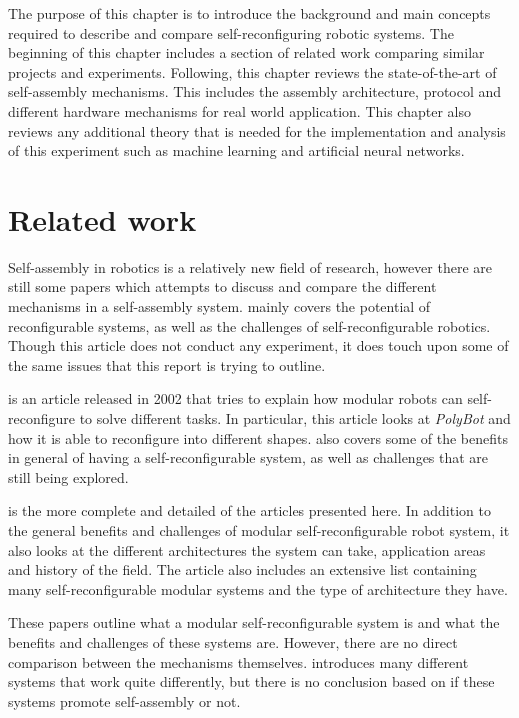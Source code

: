 The purpose of this chapter is to introduce the background and main concepts required to describe and compare self-reconfiguring robotic systems.
The beginning of this chapter includes a section of related work comparing similar projects and experiments.
Following, this chapter reviews the state-of-the-art of self-assembly mechanisms.
This includes the assembly architecture, protocol and different hardware mechanisms for real world application.
This chapter also reviews any additional theory that is needed for the implementation and analysis of this experiment such as machine learning and artificial neural networks.

\section{Related work}
Self-assembly in robotics is a relatively new field of research, however there are still some papers which attempts to discuss and compare the different mechanisms in a self-assembly system. 
\cite{murata_self-reconfigurable_2007} mainly covers the potential of reconfigurable systems, as well as the challenges of self-reconfigurable robotics. 
Though this article does not conduct any experiment, it does touch upon some of the same issues that this report is trying to outline.

\cite{yim_modular_2002} is an article released in 2002 that tries to explain how modular robots can self-reconfigure to solve different tasks. 
In particular, this article looks at \emph{PolyBot} and how it is able to reconfigure into different shapes. 
\cite{yim_modular_2002} also covers some of the benefits in general of having a self-reconfigurable system, as well as challenges that are still being explored.

\cite{yim_modular_2007} is the more complete and detailed of the articles presented here. 
In addition to the general benefits and challenges of modular self-reconfigurable robot system, it also looks at the different architectures the system can take, application areas and history of the field.
The article also includes an extensive list containing many self-reconfigurable modular systems and the type of architecture they have.

These papers outline what a modular self-reconfigurable system is and what the benefits and challenges of these systems are.
However, there are no direct comparison between the mechanisms themselves.
\cite{yim_modular_2007} introduces many different systems that work quite differently, but there is no conclusion based on if  these systems promote self-assembly or not.

